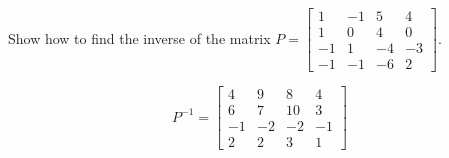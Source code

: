 
\begin{exerciseStatement}


Show how to find the inverse of the matrix \(P= \left[\begin{array}{cccc}
1 & -1 & 5 & 4 \\
1 & 0 & 4 & 0 \\
-1 & 1 & -4 & -3 \\
-1 & -1 & -6 & 2
\end{array}\right] \).


\end{exerciseStatement}
    
\begin{exerciseAnswer} 
\[P^{-1}= \left[\begin{array}{cccc}
4 & 9 & 8 & 4 \\
6 & 7 & 10 & 3 \\
-1 & -2 & -2 & -1 \\
2 & 2 & 3 & 1
\end{array}\right] \]
\end{exerciseAnswer}
    
